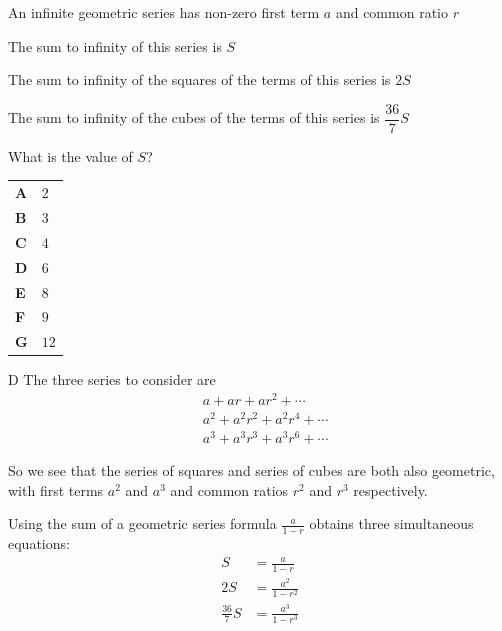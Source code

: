 \documentclass[11pt,a4paper]{article}
\begin{document}
\thispagestyle{djssolutions}
\djsFrontMatter
\clearpage
\thispagestyle{djssolutions}
\vspace*{8pt}
\begin{enumerate}[label=\textbf{\arabic*.},leftmargin=*,itemsep=0pt,start=1]
An infinite geometric series has non-zero first term $a$ and common ratio $r$

The sum to infinity of this series is $S$

The sum to infinity of the squares of the terms of this series is $2S$

The sum to infinity of the cubes of the terms of this series is $\dfrac{36}{7}S$

What is the value of $S$?

\par\vspace*{12pt}
\begin{tabularx}{\linewidth}{@{}>{\bfseries}l Y@{}}
A &
$2$
\\[0.8em]
B &
$3$
\\[0.8em]
C &
$4$
\\[0.8em]
D &
$6$
\\[0.8em]
E &
$8$
\\[0.8em]
F &
$9$
\\[0.8em]
G &
$12$
\\
\end{tabularx}

\begin{djsSolution}{D}
The three series to consider are
\begin{align*}
    &a+ar+ar^2+\cdots\\[8pt]
    &a^2+a^2r^2+a^2r^4+\cdots\\[8pt]
    &a^3+a^3r^3+a^3r^6+\cdots
\end{align*}

So we see that the series of squares and series of cubes are both also geometric, with first terms $a^2$ and $a^3$ and common ratios $r^2$ and $r^3$ respectively. 

Using the sum of a geometric series formula $\frac{a}{1-r}$ obtains three simultaneous equations:
\begin{align*}
    S &= \frac{a}{1-r}\\[5pt]
    2S &= \frac{a^2}{1-r^2}\\[5pt]
    \frac{36}{7}S &= \frac{a^3}{1-r^3}
\end{align*}


\end{djsSolution}
\end{enumerate}
\end{document}
